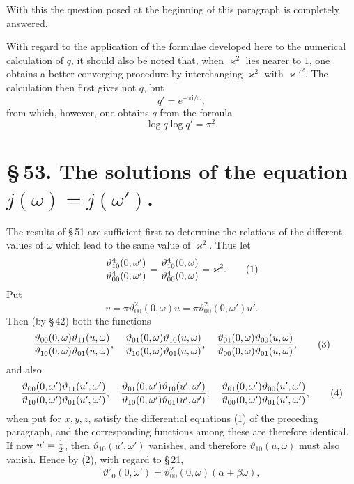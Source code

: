 \documentclass[11pt]{article}
\providecommand{\tht}{\vartheta}
\providecommand{\ii}{\mathrm{i}}
\begin{document}
With this the question posed at the beginning of this paragraph is completely answered.

With regard to the application of the formulae developed here to the numerical calculation of $q$, it should also be noted that, when $\varkappa^2$ lies nearer to $1$, one obtains a better-converging procedure by interchanging $\varkappa^2$ with $\varkappa'^2$. The calculation then first gives not $q$, but
\[
q'=e^{-\pi\ii/\omega},
\]
from which, however, one obtains $q$ from the formula
\[
\log q\log q'=\pi^2.
\]

\section*{\S\,53. The solutions of the equation $j(\omega)=j(\omega')$.}

The results of \S\,51 are sufficient first to determine the relations of the different values of $\omega$ which lead to the same value of $\varkappa^2$. Thus let
\begin{equation}
{\tht_{10}^4(0,\omega')\over\tht_{00}^4(0,\omega')}
={\tht_{10}^4(0,\omega)\over\tht_{00}^4(0,\omega)}=\varkappa^2.
\tag{1}
\end{equation}
Put
\begin{equation}
v=\pi\tht_{00}^2(0,\omega)u=\pi\tht_{00}^2(0,\omega')u'.
\tag{2}
\end{equation}
Then (by \S\,42) both the functions
\begin{equation}
{\tht_{00}(0,\omega)\tht_{11}(u,\omega)\over\tht_{10}(0,\omega)\tht_{01}(u,\omega)},\quad
{\tht_{01}(0,\omega)\tht_{10}(u,\omega)\over\tht_{10}(0,\omega)\tht_{01}(u,\omega)},\quad
{\tht_{01}(0,\omega)\tht_{00}(u,\omega)\over\tht_{00}(0,\omega)\tht_{01}(u,\omega)},
\tag{3}
\end{equation}
and also
\begin{equation}
{\tht_{00}(0,\omega')\tht_{11}(u',\omega')\over\tht_{10}(0,\omega')\tht_{01}(u',\omega')},\quad
{\tht_{01}(0,\omega')\tht_{10}(u',\omega')\over\tht_{10}(0,\omega')\tht_{01}(u',\omega')},\quad
{\tht_{01}(0,\omega')\tht_{00}(u',\omega')\over\tht_{00}(0,\omega')\tht_{01}(u',\omega')},
\tag{4}
\end{equation}
when put for $x,y,z$, satisfy the differential equations (1) of the preceding paragraph, and the corresponding functions among these are therefore identical. If now $u'={1\over2}$, then $\tht_{10}(u',\omega')$ vanishes, and therefore $\tht_{10}(u,\omega)$ must also vanish. Hence by (2), with regard to \S\,21,
\begin{equation}
\tht_{00}^2(0,\omega')=\tht_{00}^2(0,\omega)(\alpha+\beta\omega),
\tag{5}
\end{equation}
\end{document}
